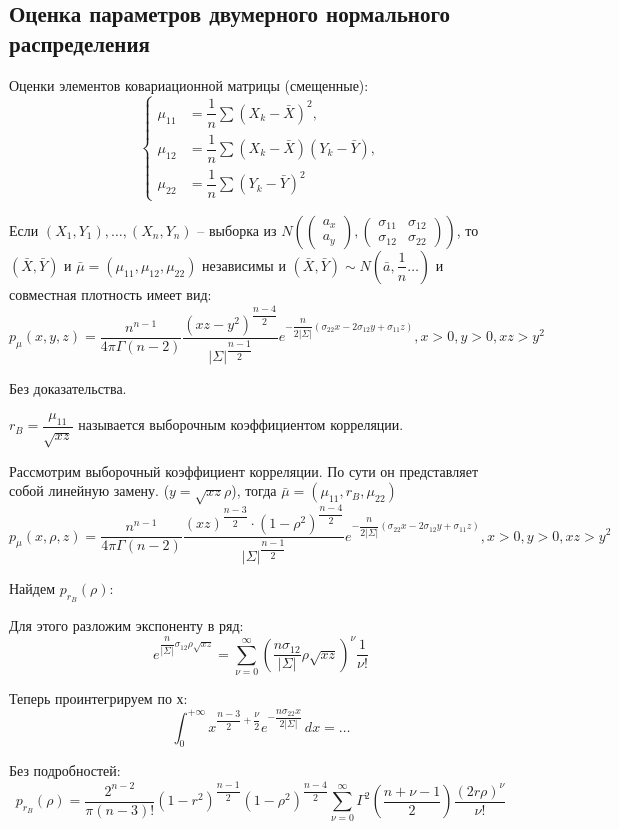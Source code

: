 \subsection{Оценка параметров двумерного нормального распределения}

Оценки элементов ковариационной матрицы (смещенные):
\[
\begin{cases}
  \mu_{11} &= \dfrac{1}{n} \sum (X_k - \bar X)^2, \\
  \mu_{12} &= \dfrac{1}{n} \sum (X_k - \bar X)(Y_k - \bar Y), \\ 
  \mu_{22} &= \dfrac{1}{n} \sum (Y_k - \bar Y)^2
\end{cases}
\]

\begin{theorem}[Фишера]
  Если $(X_1,Y_1), \dots, (X_n, Y_n)$ -- выборка из 
  $N(
    \begin{pmatrix} a_x \\ a_y \end{pmatrix},
    \begin{pmatrix}
      \sigma_{11} & \sigma_{12} \\
      \sigma_{12} & \sigma_{22}
    \end{pmatrix} )$,
  то $(\bar X, \bar Y)$ и $\bar \mu = (\mu_{11}, \mu_{12}, \mu_{22})$ независимы и
  $(\bar X, \bar Y) \sim N( \bar a, \dfrac{1}{n} \dots )$
  и совместная плотность имеет вид:
  \[
    p_{\mu} (x, y, z) = \dfrac{n^{n-1}}{4\pi \Gamma(n-2)} \dfrac{(xz - y^2)^\dfrac{n-4}{2}}{|\Sigma|^\dfrac{n-1}{2}} e^{-\dfrac{n}{2 |\Sigma|} (\sigma_{22} x - 2 \sigma_{12}y + \sigma_{11} z) }, x>0, y>0, xz>y^2
  \]
\end{theorem}
Без доказательства.

\begin{definition}
  $r_B = \dfrac{\mu_{11}}{\sqrt{xz}}$ называется выборочным коэффициентом корреляции.
\end{definition}

\begin{corollary}
  Рассмотрим выборочный коэффициент корреляции. По сути он представляет собой линейную замену.
  ($y = \sqrt{xz} \rho$),
  тогда $\bar \mu = (\mu_{11}, r_B, \mu_{22})$
  \[
    p_\mu (x, \rho, z) = 
    \dfrac{n^{n-1}}{4\pi \Gamma(n-2)}
    \dfrac{(xz)^\dfrac{n-3}{2} \cdot (1-\rho^2)^\dfrac{n-4}{2}}{|\Sigma|^\dfrac{n-1}{2}}
    e^{-\dfrac{n}{2 |\Sigma|} (\sigma_{22} x - 2 \sigma_{12}y + \sigma_{11} z) }, x>0, y>0, xz>y^2
  \]

  Найдем $p_{r_B} (\rho)$:

  Для этого разложим экспоненту в ряд:
  \[
    e^{ \dfrac{n}{|\Sigma|} \sigma_{12} \rho \sqrt{xz} }
    = \sum_{\nu=0}^\infty \left(\dfrac{n \sigma_{12}}{|\Sigma|} \rho \sqrt{xz} \right)^\nu \dfrac{1}{\nu!}
  \]

  Теперь проинтегрируем по х:
  \[
    \int_0^{+\infty} x^{\dfrac{n-3}{2} + \dfrac{\nu}{2}} e^{-\dfrac{n \sigma_{22} x}{2 |\Sigma|}} \, dx = \dots %
  \]

  Без подробностей:
  \[
    p_{r_B} (\rho) = \dfrac{2^{n-2}}{\pi (n-3)!}
    (1 - r^2)^{\dfrac{n-1}{2}}
    (1-\rho^2)^{\dfrac{n-4}{2}}
    \sum_{\nu=0}^\infty \Gamma^2\left(\dfrac{n+\nu-1}{2}\right) \dfrac{(2 r \rho)^\nu}{\nu!}
  \]
\end{corollary}

